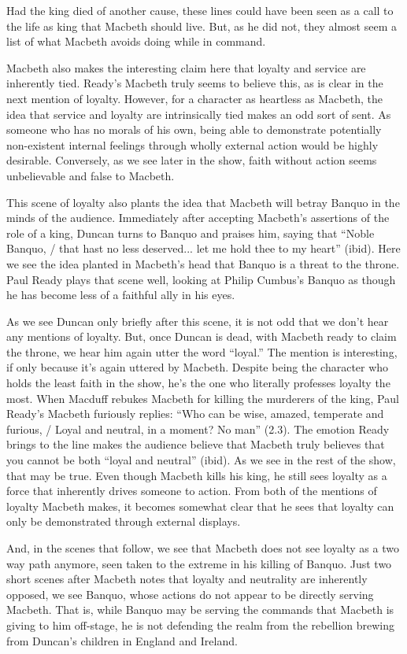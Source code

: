 \documentclass[12pt]{article}[titlepage]
\newcommand{\say}[1]{``#1''}
\newcommand{\1}{\={a}}
\newcommand{\2}{\={e}}
\newcommand{\3}{\={\i}}
\newcommand{\4}{\=o}
\newcommand{\5}{\=u}
\newcommand{\6}{\={A}}
\renewcommand{\,}{\textsuperscript{,}}
\begin{document}
Had the king died of another cause, these lines could have been seen as a call to the life as king that Macbeth should live.
But, as he did not, they almost seem a list of what Macbeth avoids doing while in command.

Macbeth also makes the interesting claim here that loyalty and service are inherently tied.
Ready's Macbeth truly seems to believe this, as is clear in the next mention of loyalty.
However, for a character as heartless as Macbeth, the idea that service and loyalty are intrinsically tied makes an odd sort of sent.
As someone who has no morals of his own, being able to demonstrate potentially non-existent internal feelings through wholly external action would be highly desirable.
Conversely, as we see later in the show, faith without action seems unbelievable and false to Macbeth.

This scene of loyalty also plants the idea that Macbeth will betray Banquo in the minds of the audience.
Immediately after accepting Macbeth's assertions of the role of a king, Duncan turns to Banquo and praises him, saying that \say{Noble Banquo, / that hast no less deserved... let me hold thee to my heart} (ibid).
Here we see the idea planted in Macbeth's head that Banquo is a threat to the throne.
Paul Ready plays that scene well, looking at Philip Cumbus's Banquo as though he has become less of a faithful ally in his eyes.

As we see Duncan only briefly after this scene, it is not odd that we don't hear any mentions of loyalty.
But, once Duncan is dead, with Macbeth ready to claim the throne, we hear him again utter the word \say{loyal.}
The mention is interesting, if only because it's again uttered by Macbeth.
Despite being the character who holds the least faith in the show, he's the one who literally professes loyalty the most.
When Macduff rebukes Macbeth for killing the murderers of the king, Paul Ready's Macbeth furiously replies: \say{Who can be wise, amazed, temperate and furious, / Loyal and neutral, in a moment? No man} (2.3).
The emotion Ready brings to the line makes the audience believe that Macbeth truly believes that you cannot be both \say{loyal and neutral} (ibid).
As we see in the rest of the show, that may be true.
Even though Macbeth kills his king, he still sees loyalty as a force that inherently drives someone to action.
From both of the mentions of loyalty Macbeth makes, it becomes somewhat clear that he sees that loyalty can only be demonstrated through external displays.

And, in the scenes that follow, we see that Macbeth does not see loyalty as a two way path anymore, seen taken to the extreme in his killing of Banquo.
Just two short scenes after Macbeth notes that loyalty and neutrality are inherently opposed, we see Banquo, whose actions do not appear to be directly serving Macbeth.
That is, while Banquo may be serving the commands that Macbeth is giving to him off-stage, he is not defending the realm from the rebellion brewing from Duncan's children in England and Ireland.
\end{document}
